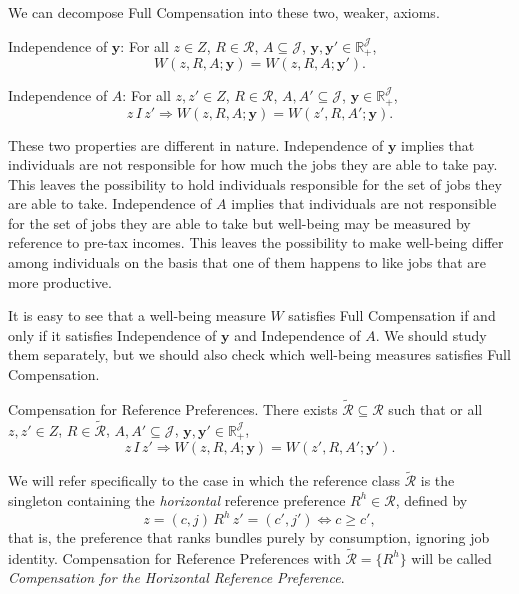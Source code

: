 \documentclass[12pt]{article}
\begin{document}
We can decompose Full Compensation into these two, weaker, axioms.

Independence of $\mathbf{y}$: For all $z\in Z$, $R\in \mathcal{R}$, $A\subseteq \mathcal{J}$, $\mathbf{y}, \mathbf{y}' \in \mathbb{R}_{+}^{\mathcal{J}}$, 
\begin{equation*}
\label{ }
W(z,R,A;\mathbf{y})=W(z,R,A;\mathbf{y}').
\end{equation*}

Independence of $A$: For all $z,z'\in Z$, $R\in \mathcal{R}$, $A,A'\subseteq \mathcal{J}$, $\mathbf{y}\in \mathbb{R}_{+}^{\mathcal{J}}$, 
\begin{equation*}
\label{ }
z\,I\,z'\Rightarrow W(z,R,A;\mathbf{y})=W(z',R,A';\mathbf{y}).
\end{equation*}

These two properties are different in nature. Independence of $\mathbf{y}$ implies that individuals are not responsible for how much the jobs they are able to take pay. This leaves the possibility to hold individuals responsible for the set of jobs they are able to take. Independence of $A$ implies that individuals are not responsible for the set of jobs they are able to take but well-being may be measured by reference to pre-tax incomes. This leaves the possibility to make well-being differ among individuals on the basis that one of them happens to like jobs that are more productive.

It is easy to see that a well-being measure $W$ satisfies Full Compensation if and only if it satisfies Independence of $\mathbf{y}$ and Independence of $A$. We should study them separately, but we should also check which well-being measures satisfies Full Compensation.

Compensation for Reference Preferences. There exists $\tilde{\mathcal{R}}\subseteq\mathcal{R}$ such that or all $z,z'\in Z$, $R\in \tilde{\mathcal{R}}$, $A,A'\subseteq \mathcal{J}$, $\mathbf{y}, \mathbf{y}' \in \mathbb{R}_{+}^{\mathcal{J}}$, 
\begin{equation*}
\label{ }
z\,I\,z'\Rightarrow W(z,R,A;\mathbf{y})=W(z',R,A';\mathbf{y}').
\end{equation*}

We will refer specifically to the case in which the reference class $\tilde{\mathcal R}$ is the singleton containing the \emph{horizontal} reference preference $R^h\in\mathcal R$, defined by
\begin{equation*}
z=(c,j)\,R^h\,z'=(c',j')\Leftrightarrow c\geq c',
\end{equation*}
that is, the preference that ranks bundles purely by consumption, ignoring job identity. Compensation for Reference Preferences with $\tilde{\mathcal R}=\{R^h\}$ will be called \emph{Compensation for the Horizontal Reference Preference}.
\end{document}

